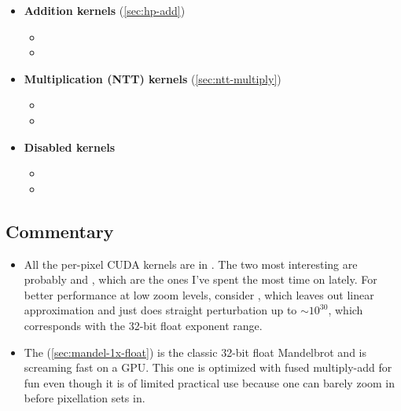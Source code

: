 \begin{itemize}
\item \textbf{Addition kernels} (\cref{sec:hp-add})
  \begin{itemize}
    \item {}
    \item {}
  \end{itemize}

\item \textbf{Multiplication (NTT) kernels} (\cref{sec:ntt-multiply})
  \begin{itemize}
    \item {}
    \item {}
  \end{itemize}

\item \textbf{Disabled kernels}
  \begin{itemize}
    \item {}
    \item {}
  \end{itemize}

\end{itemize}

\subsection{Commentary}

\begin{itemize}

\item All the per-pixel CUDA kernels are in . The two
most interesting are probably  and
, which are the ones I've spent the
most time on lately. For better performance at low zoom levels, consider
, which leaves out linear approximation
and just does straight perturbation up to $\sim 10^{30}$, which corresponds
with the 32-bit float exponent range.

\item The  (\cref{sec:mandel-1x-float}) is the classic 32-bit float Mandelbrot and 
is screaming fast on a GPU. This one is optimized with fused multiply-add for 
fun even though it is of limited practical use because one can barely zoom in before
pixellation sets in.

\end{itemize}

